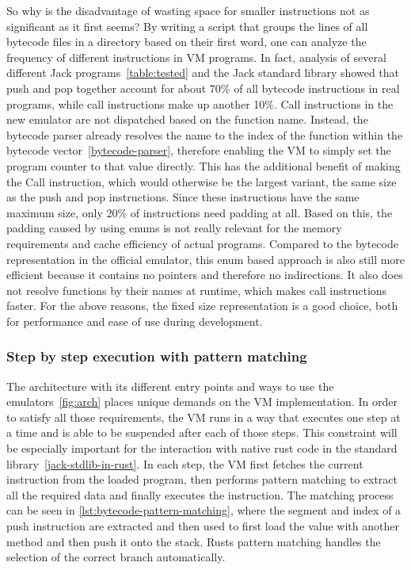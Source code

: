 So why is the disadvantage of wasting space for smaller instructions not as significant as it first seems?
By writing a script that groups the lines of all bytecode files in a directory based on their first word, one can analyze the frequency of different instructions in VM programs.
In fact, analysis of several different Jack programs~\ref{table:tested} and the Jack standard library showed that push and pop together account for about 70\% of all bytecode instructions in real programs, while call instructions make up another 10\%.
Call instructions in the new emulator are not dispatched based on the function name.
Instead, the bytecode parser already resolves the name to the index of the function within the bytecode vector~\ref{bytecode-parser}, therefore enabling the VM to simply set the program counter to that value directly.
This has the additional benefit of making the Call instruction, which would otherwise be the largest variant, the same size as the push and pop instructions.
Since these instructions have the same maximum size, only 20\% of instructions need padding at all.
Based on this, the padding caused by using enums is not really relevant for the memory requirements and cache efficiency of actual programs.
Compared to the bytecode representation in the official emulator, this enum based approach is also still more efficient because it contains no pointers and therefore no indirections.
It also does not resolve functions by their names at runtime, which makes call instructions faster.
For the above reasons, the fixed size representation is a good choice, both for performance and ease of use during development.

\subsubsection{Step by step execution with pattern matching} \label{step-by-step}
The architecture with its different entry points and ways to use the emulators~\ref{fig:arch} places unique demands on the VM implementation.
In order to satisfy all those requirements, the VM runs in a way that executes one step at a time and is able to be suspended after each of those steps.
This constraint will be especially important for the interaction with native rust code in the standard library~\ref{jack-stdlib-in-rust}.
In each step, the VM first fetches the current instruction from the loaded program, then performs pattern matching to extract all the required data and finally executes the instruction.
The matching process can be seen in \cref{lst:bytecode-pattern-matching}, where the segment and index of a push instruction are extracted and then used to first load the value with another method and then push it onto the stack.
Rusts pattern matching handles the selection of the correct branch automatically.

